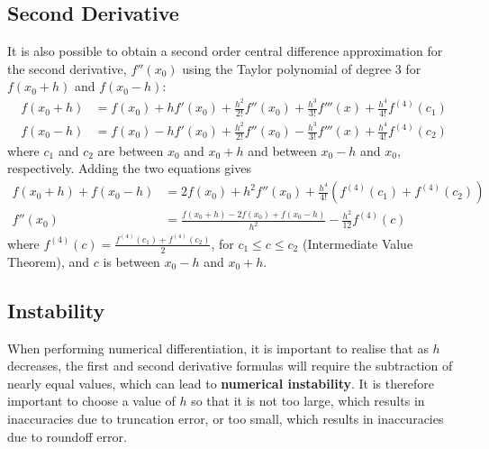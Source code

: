 \documentclass{article}
\begin{document}
\subsection{Second Derivative}
It is also possible to obtain a second order central difference approximation for the second derivative, \(f''\left( x_0 \right)\) using the Taylor polynomial of degree 3
for \(f\left( x_0 + h \right)\) and \(f\left( x_0 - h \right)\):
\begin{align*}
    f\left( x_0 + h \right) & = f\left( x_0 \right) + h f'\left( x_0 \right) + \frac{h^2}{2!} f''\left( x_0 \right) + \frac{h^3}{3!} f'''\left( x \right) + \frac{h^4}{4!} f^{\left( 4 \right)}\left( c_1 \right) \\
    f\left( x_0 - h \right) & = f\left( x_0 \right) - h f'\left( x_0 \right) + \frac{h^2}{2!} f''\left( x_0 \right) - \frac{h^3}{3!} f'''\left( x \right) + \frac{h^4}{4!} f^{\left( 4 \right)}\left( c_2 \right)
\end{align*}
where \(c_1\) and \(c_2\) are between \(x_0\) and \(x_0 + h\) and between \(x_0 - h\) and \(x_0\), respectively.
Adding the two equations gives
\begin{align*}
    f\left( x_0 + h \right) + f\left( x_0 - h \right) & = 2f\left( x_0 \right) + h^2 f''\left( x_0 \right) + \frac{h^4}{4!} \left( f^{\left( 4 \right)}\left( c_1 \right) + f^{\left( 4 \right)}\left( c_2 \right) \right) \\
    f''\left( x_0 \right)                             & = \frac{f\left( x_0 + h \right) - 2f\left( x_0 \right) + f\left( x_0 - h \right)}{h^2} - \frac{h^2}{12} f^{\left( 4 \right)}\left( c \right)
\end{align*}
where \(f^{\left( 4 \right)}\left( c \right) = \frac{f^{\left( 4 \right)}\left( c_1 \right) + f^{\left( 4 \right)}\left( c_2 \right)}{2}\), for \(c_1 \leq c \leq c_2\) (Intermediate Value Theorem),
and \(c\) is between \(x_0 - h\) and \(x_0 + h\).
\subsection{Instability}
When performing numerical differentiation, it is important to realise that as \(h\) decreases, the first and second derivative formulas will require the
subtraction of nearly equal values, which can lead to \textbf{numerical instability}. It is therefore important to choose a value of \(h\)
so that it is not too large, which results in inaccuracies due to truncation error, or too small, which results in inaccuracies due to roundoff error.
\end{document}
